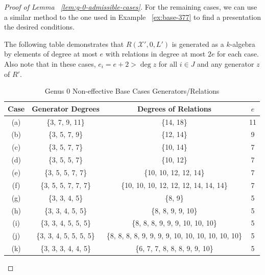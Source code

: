 \documentclass{amsart}
\theoremstyle{plain}
\theoremstyle{definition}
\theoremstyle{remark}
\numberwithin{equation}{section}
\newcommand \sx{\mathscr X}
\begin{document}
\begin{proof}[Proof of Lemma ~\ref{lem:g-0-admissible-cases}]
For the remaining cases, we can use a similar method to the one
used in Example ~\ref{ex:base-377} to find a presentation the
desired conditions.

The following table demonstrates that $R(\sx', 0, L')$ is
generated as a $k$-algebra by elements of degree at most $e$
with relations in degree at most $2e$ for each case. Also note
that in these cases, $e_i = e + 2 > \deg z$ for all $i \in J$
and any generator $z$ of $R'$.
\begin{longtable}
	{| c || c | c | c |}
	\caption{Genus 0 Non-effective Base Cases Generators/Relations}
	\label{table:g-0-base-cases-degrees}
	
	\tabularnewline
	
	\hline
	Case & Generator Degrees & Degrees of Relations & $e$\\
	\hline
	\hline

	(a) & \{3, 7, 9, 11\} & \{14, 18\} & 11\\	\hline

	(b) & \{3, 5, 7, 9\} & \{12, 14\}	& 9\\ \hline

	(c) & \{3, 5, 7, 7\} & \{10, 14\}	& 7\\ \hline
	
	(d) & \{3, 5, 5, 7\} & \{10, 12\}	& 7\\ \hline
	
	(e) & \{3, 5, 5, 7, 7\} & \{10, 10, 12, 12, 14\}	& 7\\ \hline
	
	(f) & \{3, 5, 5, 7, 7, 7\} & \{10, 10, 10, 12, 12, 12, 14, 14, 14\}	& 7\\ \hline

	(g) & \{3, 3, 4, 5\} & \{8, 9\} & 5\\ \hline
	
	(h) & \{3, 3, 4, 5, 5\} & \{8, 8, 9, 9, 10\} & 5\\ \hline
	
	(i) & \{3, 3, 4, 5, 5, 5\} &
	\{8, 8, 8, 9, 9, 9, 10, 10, 10\} & 5\\ \hline
	
	(j) & \{3, 3, 4, 5, 5, 5, 5\} &
	\{8, 8, 8, 8, 9, 9, 9, 9, 10, 10, 10, 10, 10, 10\} & 5\\ \hline

	(k) &	\{3, 3, 3, 4,	4, 5\} & \{6, 7, 7, 8, 8, 8, 9, 9, 10\} & 5\\ \hline
\end{longtable}


\end{proof}
\end{document}
